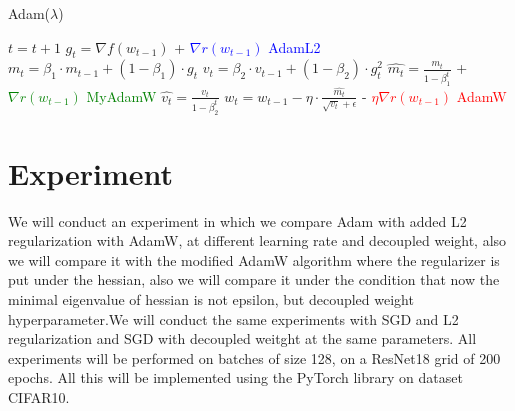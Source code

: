 \documentclass{article}
\begin{document}
\begin{algorithm}[H]
            
    \caption{Adam($\lambda$)}\label{alg:Adam}

    \begin{algorithmic}
    \small{
    \State $t = t+1$
    \State $g_t = \nabla f(w_{t-1})$ + \textcolor{blue}{$\nabla r(w_{t-1})$} \hfill \textcolor{blue}{AdamL2}    
    \State $m_t = \beta_1 \cdot m_{t-1} + (1 - \beta_1) \cdot g_t$
    \State $v_t = \beta_2 \cdot v_{t-1} + (1 - \beta_2) \cdot g_t^2$
    \State $\hat{m_t} = \frac{m_t}{1-\beta_1^t}$ + \textcolor{green}{$\nabla r(w_{t-1})$} \hfill \textcolor{green}{MyAdamW}
    \State $\hat{v_t} = \frac{v_t}{1-\beta_2^t}$ 
    \State $w_t = w_{t-1} - \eta \cdot \frac{\hat{m_t}}{\sqrt{v_t} + \epsilon}$    - \textcolor{red}{$\eta \nabla r(w_{t-1})$ } \hfill \textcolor{red}{AdamW}
    \EndWhile
    }
\end{algorithmic}
\end{algorithm}






\section{Experiment}

We will conduct an experiment in which we compare Adam with added L2 regularization with AdamW, at different learning rate and decoupled weight, also we will compare it with the modified AdamW algorithm where the regularizer is put under the hessian, also we will compare it under the condition that now the minimal eigenvalue of hessian is not epsilon, but decoupled weight hyperparameter.We will conduct the same experiments with SGD and L2 regularization and SGD with decoupled weitght at the same parameters. All experiments will be performed on batches of size 128, on a ResNet18 grid of 200 epochs. All this will be implemented using the PyTorch library on dataset CIFAR10.
\end{document}

